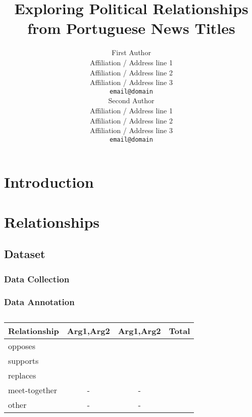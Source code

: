 \documentclass[11pt,a4paper]{article}
\title{Exploring Political Relationships from Portuguese News Titles}
\author{First Author \\
  Affiliation / Address line 1 \\
  Affiliation / Address line 2 \\
  Affiliation / Address line 3 \\
  \texttt{email@domain} \\\And
  Second Author \\
  Affiliation / Address line 1 \\
  Affiliation / Address line 2 \\
  Affiliation / Address line 3 \\
  \texttt{email@domain} \\}
\date{}
\begin{document}
\maketitle
\begin{abstract}

\end{abstract}


\section{Introduction}
\label{sec:intro}


\section{Relationships}
\label{sec:rel}






\subsection{Dataset}
\label{subsec:rel_data}

\subsubsection{Data Collection}
\label{subsubsec:rel_data_collec}


\subsubsection{Data Annotation}
\label{subsubsec:rel_data_annot}


\begin{table}[!h]
\centering
\begin{tabular}{lccr}
\hline \textbf{Relationship} & \textbf{Arg1,Arg2} & \textbf{Arg1,Arg2} & \textbf{Total} \\ \hline
opposes        &  &  \\
supports       &  &  \\
replaces       &  &  \\
meet-together  & - & - \\
other          & - & - & \\
\hline
\end{tabular}
\caption{\label{font-table}  }
\end{table}
\end{document}
